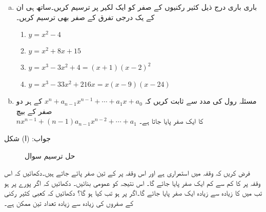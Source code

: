 
\begin{enumerate}[a.]
\item
باری باری درج ذیل کثیر رکنیوں کے صفر کو ایک لکیر پر ترسیم کریں۔ساتھ ہی ان کے یک درجی تفرق کے  صفر بھی ترسیم کریں۔
\begin{enumerate}[1.]
\item
$y=x^2-4$
\item
$y=x^2+8x+15$
\item
$y=x^3-3x^2+4=(x+1)(x-2)^2$
\item
$y=x^3-33x^2+216x=x(x-9)(x-24)$
\end{enumerate}
\item
مسئلہ رول کی مدد سے ثابت کریں کہ 
$x^n+a_{n-1}x^{n-1}+\cdots+a_1x+a_0$
کے ہر دو صفر کے بیچ \\
$nx^{n-1}+(n-1)a_{n-1}x^{n-2}+\cdots+a_1$
کا ایک صفر پایا جاتا ہے۔
\end{enumerate}
جواب:\quad 
(ا) شکل 
\begin{figure}
\centering
{}
\caption{حل ترسیم سوال }
\label{شکل_سوال_استعمال_جذر_الف}
\end{figure}
فرض کریں کہ وقفہ  میں  استمراری ہے اور اس وقفہ پر  کے تین صفر پائے جاتے ہیں۔دکھائیں کہ اس وقفہ پر  کا کم سے کم ایک صفر پایا جائے گا۔ اس نتیجہ کو عمومی بنائیں۔
دکھائیں کہ اگر پورے  پر   ہو تب  میں  کا زیادہ سے زیادہ ایک صفر پایا جائے گا۔اگر  پر  ہو تب کیا ہو گا؟
دکھائیں کہ کعبی کثیر رکنی کے صفروں کی زیادہ سے زیادہ تعداد تین ممکن ہے۔


